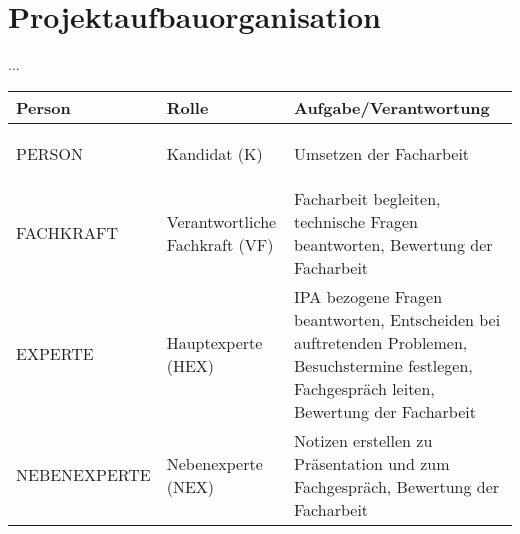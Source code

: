 \chapter{Projektaufbauorganisation}\label{ch:projektaufbauorganisation}
...

\renewcommand{\arraystretch}{1.5}
\begin{longtable}{|p{}|p{}|p{}|}
    \hline
    \textbf{Person} & \textbf{Rolle} & \textbf{Aufgabe/Verantwortung} \\
    \hline
    \hypertarget{k}{PERSON} & Kandidat (K) & Umsetzen der Facharbeit \\
    \hline
    \hypertarget{vf}{FACHKRAFT} & Verantwortliche Fachkraft (VF) & Facharbeit begleiten, technische Fragen beantworten, Bewertung der Facharbeit \\
    \hline
    \hypertarget{hex}{EXPERTE} & Hauptexperte (HEX) & IPA bezogene Fragen beantworten, Entscheiden bei auftretenden Problemen, Besuchstermine festlegen, Fachgespräch leiten, Bewertung der Facharbeit \\
    \hline
    \hypertarget{nex}{NEBENEXPERTE} & Nebenexperte (NEX) & Notizen erstellen zu Präsentation und zum Fachgespräch, Bewertung der Facharbeit \\
    \hline
\end{longtable}
\renewcommand{\arraystretch}{1}
